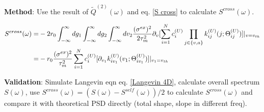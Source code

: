 \documentclass{article}
\begin{document}
	\textbf{Method}: Use the result of $\tilde{Q}^{(2)}(\omega)$ and eq. \eqref{S cross} to calculate $S^{cross}(\omega)$.
	
	\begin{align}
		S^{cross}(\omega)=&-2r_0\int_{-\infty}^{\infty}dg_1\int_{-\infty}^{\infty}dg_2\int_{-\infty}^{\infty}dv_2\frac{(\sigma^{ex})^2}{2\tau_m^2}\partial_v[\sum_{i=1}^{N}c_i^{(U)}\prod_{j\in\{v,a\}}k_{ij}^{(U)}(j;\Theta_{ij}^{(U)})]|_{v=v_{th}}\notag\\
		=&-r_0\frac{(\sigma^{ex})^2}{\tau_m^2}\sum_{i=1}^{N}c_i^{(U)}[\partial_{v_1}k_{iv_1}^{(U)}(v_1;\Theta_{iv_1}^{(U)})]|_{v_1=v_{th}}
	\end{align}
	
	\textbf{Validation}: Simulate Langevin eqn eq. \eqref{Langevin 4D}, calculate overall spectrum $S(\omega)$, use $S^{cross}(\omega)=(S(\omega)-S^{self}(\omega))/2$ to calculate $S^{cross}(\omega)$ and compare it with theoretical PSD directly (total shape, slope in different freq).
	
	
\end{document}
